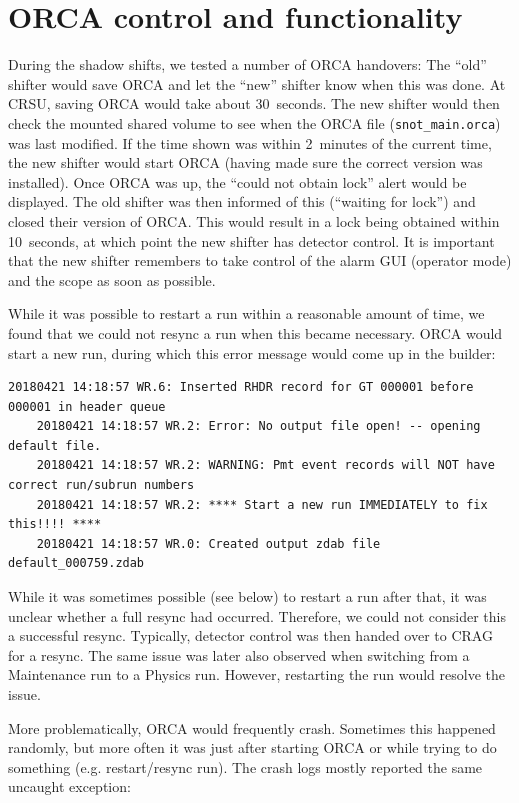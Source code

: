 \documentclass[a4paper,10pt]{article}
\begin{document}
\section{ORCA control and functionality}
During the shadow shifts, we tested a number of ORCA handovers: The ``old'' shifter would save ORCA and let the ``new'' shifter know when this was done. At CRSU, saving ORCA would take about 30~seconds. The new shifter would then check the mounted shared volume to see when the ORCA file ({\tt snot\_main.orca}) was last modified. If the time shown was within 2~minutes of the current time, the new shifter would start ORCA (having made sure the correct version was installed). Once ORCA was up, the ``could not obtain lock'' alert would be displayed. The old shifter was then informed of this (``waiting for lock'') and closed their version of ORCA. This would result in a lock being obtained within 10~seconds, at which point the new shifter has detector control. It is important that the new shifter remembers to take control of the alarm GUI (operator mode) and the scope as soon as possible.

While it was possible to restart a run within a reasonable amount of time, we found that we could not resync a run when this became necessary. ORCA would start a new run, during which this error message would come up in the builder:

{\footnotesize
\begin{Verbatim}[xleftmargin=-8mm]
	20180421 14:18:57 WR.6: Inserted RHDR record for GT 000001 before 000001 in header queue
	20180421 14:18:57 WR.2: Error: No output file open! -- opening default file.
	20180421 14:18:57 WR.2: WARNING: Pmt event records will NOT have correct run/subrun numbers
	20180421 14:18:57 WR.2: **** Start a new run IMMEDIATELY to fix this!!!! ****
	20180421 14:18:57 WR.0: Created output zdab file default_000759.zdab
\end{Verbatim}
}

While it was sometimes possible (see below) to restart a run after that, it was unclear whether a full resync had occurred. Therefore, we could not consider this a successful resync. Typically, detector control was then handed over to CRAG for a resync. The same issue was later also observed when switching from a Maintenance run to a Physics run. However, restarting the run would resolve the issue.

More problematically, ORCA would frequently crash. Sometimes this happened randomly, but more often it was just after starting ORCA or while trying to do something (e.g. restart/resync run). The crash logs mostly reported the same uncaught exception:
\end{document}
